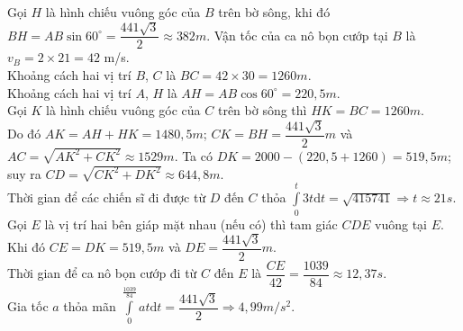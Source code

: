 \begin{ex}
{\begin{itemchoice}
        Gọi $H$ là hình chiếu vuông góc của $B$ trên bờ sông, khi đó $BH=AB\sin 60^\circ=\dfrac{441\sqrt{3}}{2}\approx 382m$.
        \itemch Vận tốc của ca nô bọn cướp tại $B$ là $v_B=2\times 21=42$ m/s.\\
        Khoảng cách hai vị trí $B$, $C$ là $BC=42\times 30=1260m$.\\
        Khoảng cách hai vị trí $A$, $H$ là $AH=AB\cos 60^\circ=220{,}5m$.\\
        Gọi $K$ là hình chiếu vuông góc của $C$ trên bờ sông thì $HK=BC=1260m$.\\
        Do đó $AK=AH+HK=1480{,}5m$; $CK=BH=\dfrac{441\sqrt{3}}{2}m$ và $AC=\sqrt{AK^2+CK^2}\approx 1529 m$.
        \itemch Ta có $DK=2000-\left(220{,}5+1260\right)=519{,}5m$; suy ra $CD=\sqrt{CK^2+DK^2}\approx 644{,}8m$.\\
        Thời gian để các chiến sĩ đi được từ $D$ đến $C$ thỏa $\displaystyle\int\limits_0^t{3t\mathrm{d}t}=\sqrt{415741}\Rightarrow t\approx 21s$.
        \itemch Gọi $E$ là vị trí hai bên giáp mặt nhau (nếu có) thì tam giác $CDE$ vuông tại $E$.\\
        Khi đó $CE=DK=519{,}5m$ và $DE=\dfrac{441\sqrt{3}}{2}m$.\\
        Thời gian để ca nô bọn cướp đi từ $C$ đến $E$ là $\dfrac{CE}{42}=\dfrac{1039}{84}\approx 12{,}37s$.\\
        Gia tốc $a$ thỏa mãn $\displaystyle\int\limits_0^{\tfrac{1039}{84}}{at \mathrm{d}t}=\dfrac{441\sqrt{3}}{2}\Rightarrow 4{,}99m/s^2$.
    \end{itemchoice}
    }
\end{ex}

